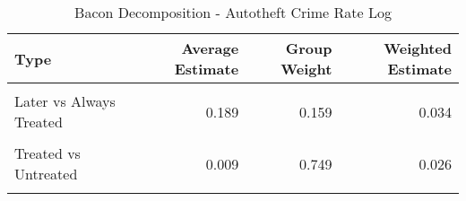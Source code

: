 \begin{table}[H]

\caption{\label{tab:tab:bacondecompositionAutotheft}Bacon Decomposition - Autotheft Crime Rate Log}
\centering
\begin{tabular}[t]{lrrr}
\toprule
Type & Average Estimate & Group Weight & Weighted Estimate\\
\midrule
\cellcolor{gray!6}{Earlier vs Later Treated} & \cellcolor{gray!6}{0.089} & \cellcolor{gray!6}{0.068} & \cellcolor{gray!6}{0.006}\\
Later vs Always Treated & 0.189 & 0.159 & 0.034\\
\cellcolor{gray!6}{Later vs Earlier Treated} & \cellcolor{gray!6}{0.099} & \cellcolor{gray!6}{0.023} & \cellcolor{gray!6}{0.002}\\
Treated vs Untreated & 0.009 & 0.749 & 0.026\\
\cellcolor{gray!6}{Total TWFE} & \cellcolor{gray!6}{NaN} & \cellcolor{gray!6}{NaN} & \cellcolor{gray!6}{0.068}\\
\bottomrule
\end{tabular}
\end{table}
